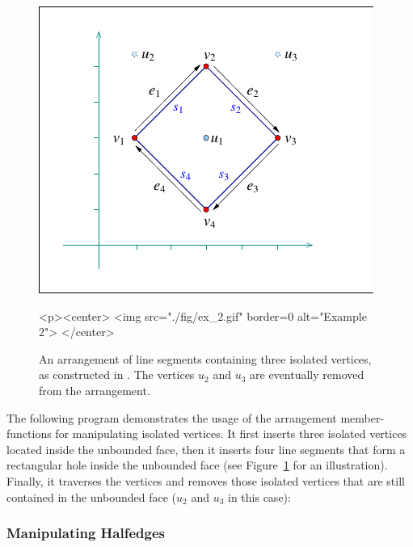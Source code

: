 \begin{figure}[t]
\begin{ccTexOnly}
  \begin{center}
  \includegraphics{Arrangement_on_surface_2/fig/ex_2}
  \end{center}
\end{ccTexOnly}
\begin{ccHtmlOnly}
  <p><center>
  <img src="./fig/ex_2.gif" border=0 alt="Example 2">
  </center>
\end{ccHtmlOnly}
\caption{An arrangement of line segments containing three isolated
vertices, as constructed in . The vertices $u_2$
and $u_3$ are eventually removed from the arrangement.\label{arr_fig:ex_2}}
\end{figure}

The following program demonstrates the usage of the arrangement
member-functions for manipulating isolated vertices. It first
inserts three isolated vertices located inside the unbounded face, then
it inserts four line segments that form a rectangular hole inside the
unbounded face (see Figure~\ref{arr_fig:ex_2} for an
illustration). Finally, it traverses the vertices and removes those
isolated vertices that are still contained in the unbounded face
($u_2$ and $u_3$ in this case):


\subsubsection{Manipulating Halfedges\label{arr_sssec:mf_halfedges}}

